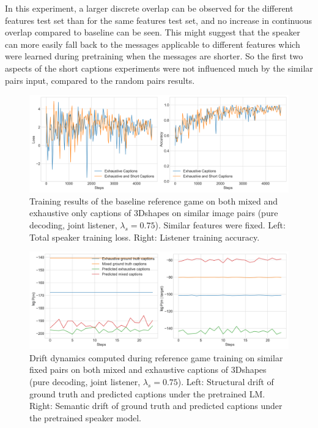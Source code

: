 In this experiment, a larger discrete overlap can be observed for the different features test set than for the same features test set, and no increase in continuous overlap compared to baseline can be seen. This might suggest that the speaker can more easily fall back to the messages applicable to different features which were learned during pretraining when the messages are shorter. So the first two aspects of the short captions experiments were not influenced much by the similar pairs input, compared to the random pairs results.%
\begin{figure}[h]
	\centering
	\includegraphics[width=\linewidth]{images/3dshapes_similarFixed_short_vs_exh_075_losses.png}
	\caption{Training results of the baseline reference game on both mixed and exhaustive only captions of 3Dshapes on similar image pairs (pure decoding, joint listener, $\lambda_s=0.75$). Similar features were fixed. Left: Total speaker training loss. Right: Listener training accuracy.}
	\label{fig:3dshapes_wShort_similarFixed_075_speaker_losses_listener_acc}
\end{figure}

\begin{figure}[h]
	\centering
	\includegraphics[width=\linewidth]{images/3dshapes_exh_short_structural_semantic_drift_49_pure_075_similarFixed.png}
	\caption{Drift dynamics computed during reference game training on similar fixed pairs on both mixed and exhaustive captions of 3Dshapes (pure decoding, joint listener, $\lambda_s=0.75$). Left: Structural drift of ground truth and predicted captions under the pretrained LM. Right: Semantic drift of ground truth and predicted captions under the pretrained speaker model.}
	\label{fig:3dshapes_wShort_similarFixed_075_str_sem_drift}
\end{figure}

